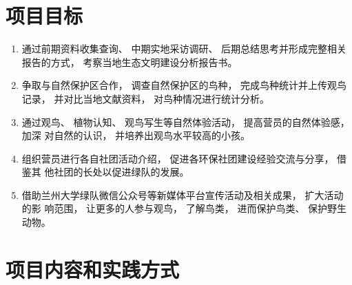\documentclass[UTF8,a4paper，12pt]{ctexart}
\begin{document}
\section{项目目标}
\begin{enumerate}[itemindent=1em]
    \item 通过前期资料收集查询、 中期实地采访调研、 后期总结思考并形成完整相关报告的方式， 考察当地生态文明建设分析报告书。
    \item 争取与自然保护区合作， 调查自然保护区的鸟种， 完成鸟种统计并上传观鸟记录，
并对比当地文献资料， 对鸟种情况进行统计分析。
    \item 通过观鸟、 植物认知、 观鸟写生等自然体验活动， 提高营员的自然体验感， 加深
对自然的认识， 并培养出观鸟水平较高的小孩。
    \item 组织营员进行各自社团活动介绍， 促进各环保社团建设经验交流与分享， 借鉴其
他社团的长处以促进绿队的发展。
    \item 借助兰州大学绿队微信公众号等新媒体平台宣传活动及相关成果， 扩大活动的影
响范围， 让更多的人参与观鸟， 了解鸟类， 进而保护鸟类、 保护野生动物。
\end{enumerate}
\section{项目内容和实践方式}
\end{document}
